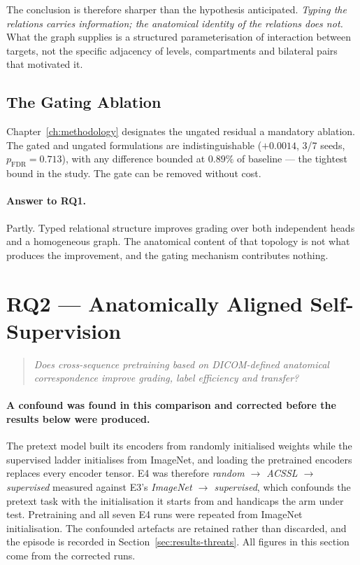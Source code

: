 \documentclass[12pt,a4paper]{report}
\begin{document}
The conclusion is therefore sharper than the hypothesis anticipated.
\emph{Typing the relations carries information; the anatomical identity of the
relations does not.} What the graph supplies is a structured parameterisation of
interaction between targets, not the specific adjacency of levels, compartments
and bilateral pairs that motivated it.

\subsection{The Gating Ablation}

Chapter~\ref{ch:methodology} designates the ungated residual a mandatory
ablation. The gated and ungated formulations are indistinguishable
($+0.0014$, 3/7 seeds, $p_{\mathrm{FDR}} = 0.713$), with any difference bounded
at $0.89\%$ of baseline --- the tightest bound in the study. The gate can be
removed without cost.

\paragraph{Answer to RQ1.} Partly. Typed relational structure improves grading
over both independent heads and a homogeneous graph. The anatomical content of
that topology is not what produces the improvement, and the gating mechanism
contributes nothing.

\section{RQ2 --- Anatomically Aligned Self-Supervision}
\label{sec:results-rq2}

\begin{quote}
\emph{Does cross-sequence pretraining based on DICOM-defined anatomical
correspondence improve grading, label efficiency and transfer?}
\end{quote}

\paragraph{A confound was found in this comparison and corrected before the
results below were produced.} The pretext model built its encoders from randomly
initialised weights while the supervised ladder initialises from ImageNet, and
loading the pretrained encoders replaces every encoder tensor. E4 was therefore
\emph{random $\rightarrow$ ACSSL $\rightarrow$ supervised} measured against E3's
\emph{ImageNet $\rightarrow$ supervised}, which confounds the pretext task with
the initialisation it starts from and handicaps the arm under test. Pretraining
and all seven E4 runs were repeated from ImageNet initialisation. The confounded
artefacts are retained rather than discarded, and the episode is recorded in
Section~\ref{sec:results-threats}. All figures in this section come from the
corrected runs.
\end{document}
